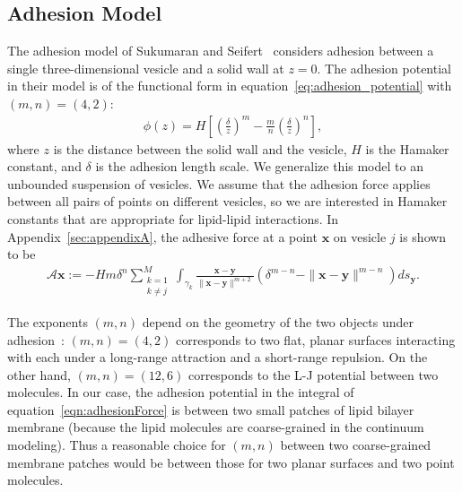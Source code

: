 \documentclass[prf,superscriptaddress,showpacs]{revtex4-1}
\renewcommand{\AA}{\mathcal{A}}
\newcommand{\xx}{\mathbf{x}}
\newcommand{\yy}{\mathbf{y}}
\begin{document}
\subsection{Adhesion Model}
The adhesion model of Sukumaran and Seifert~\cite{suk-sei2001} considers
adhesion between a single three-dimensional vesicle and a solid wall at
$z=0$.   The adhesion
potential in their model is of the functional form in
equation~\eqref{eq:adhesion_potential} with $(m,n) = (4,2)$:
\begin{align}
\label{eq:adhesion_potential}
  \phi(z) = H \left[ 
    \left(\frac{\delta}{z}\right)^m - \frac{m}{n} \left(\frac{\delta}{z}\right)^n \right],
\end{align}
where $z$ is the distance between the solid wall and the vesicle,
$H$ is the Hamaker constant, and $\delta$ is the adhesion length
scale.  We generalize this model to an unbounded suspension of vesicles.
We assume that the adhesion force applies between all pairs of points on
different vesicles, so we are interested in Hamaker constants that are
appropriate for lipid-lipid interactions. In
Appendix~\ref{sec:appendixA}, the adhesive force at a point $\xx$ on
vesicle $j$ is shown to be
\begin{align}
  \AA\xx:=-H m \delta^{n}\sum_{\substack{k=1 \\ k \neq j}}^M 
  \int_{\gamma_k} \frac{\xx - \yy}{\|\xx - \yy\|^{m+2}} 
  \left(\delta^{m-n} - \|\xx - \yy\|^{m-n} \right) ds_\yy.
  \label{eqn:adhesionForce}
\end{align}


The exponents $(m,n)$ depend on the geometry of the two objects under
adhesion~\cite{Book_IntermolecularSurfaceForces}: $(m,n)=(4,2)$
corresponds to two flat, planar surfaces interacting with each under a
long-range attraction and a short-range repulsion. On the other hand,
$(m,n) = (12,6)$ corresponds to the L-J potential between two molecules.
In our case,  the adhesion potential in  the integral of
equation~\eqref{eqn:adhesionForce} is between two small patches of lipid
bilayer membrane (because the lipid molecules are coarse-grained in the continuum modeling).
Thus a reasonable choice for $(m,n)$ between two coarse-grained membrane patches
 would be between those for two planar surfaces and two point molecules. 
 
\end{document}
